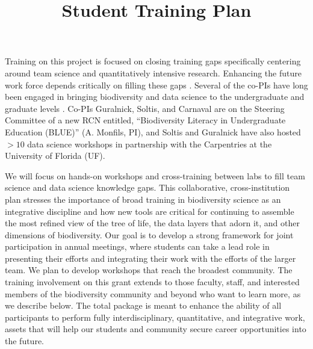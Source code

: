 \documentclass[11pt]{article}
\title{Student Training Plan \vspace{-1.5ex}}
\author{}
\date{}
\begin{document}
\maketitle
\vspace{-6em}




Training on this project is focused on closing training gaps
specifically centering around team science and quantitatively
intensive research.
Enhancing the future work force depends critically on filling these
gaps \citep{woodin2010}. Several of the co-PIs have long been engaged
in bringing biodiversity and data science to the undergraduate
and graduate levels \citep[e.g.,][]{cook2014, lacey2017}. Co-PIs
Guralnick, Soltis, and Carnaval are on the Steering Committee of a new
RCN entitled, ``Biodiversity Literacy in Undergraduate Education
(BLUE)'' (A. Monfils, PI), and Soltis and Guralnick have also hosted
$>10$ data science workshops in partnership with the Carpentries at
the University of Florida (UF). 

We will focus on hands-on workshops and cross-training between labs to
fill team science and data science knowledge gaps. This collaborative,
cross-institution plan stresses the importance of broad training in
biodiversity science as an integrative discipline and how new tools
are critical for continuing to assemble the most refined view of the
tree of life, the data layers that adorn it, and other dimensions of
biodiversity.  Our goal is to develop a strong framework for joint
participation in annual meetings, where students can take a lead role
in presenting their efforts and integrating their work with the
efforts of the larger team.  We plan to develop workshops that reach
the broadest community.  The training involvement on this grant
extends to those faculty, staff, and interested members of the
biodiversity community and beyond who want to learn more, as we
describe below. The total package is meant to enhance the ability of
all participants to perform fully interdisciplinary, quantitative, and
integrative work, assets that will help our students and community
secure career opportunities into the future.
\end{document}
